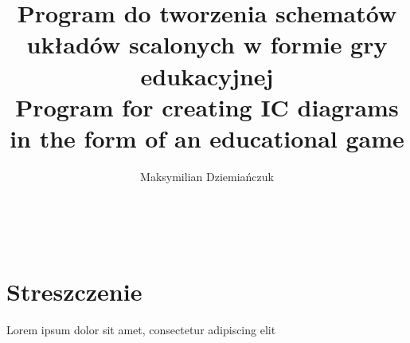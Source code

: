 \documentclass[12pt,a4paper,twoside]{report}
\title{\textbf{Program do tworzenia schematów układów scalonych w formie gry edukacyjnej}\\[2ex]
    \large Program for creating IC diagrams in the form of an educational game\\
}
\author{Maksymilian Dziemiańczuk}
\date{}
\begin{document}


\newpage \thispagestyle{empty} \ \newpage

\section*{Streszczenie}
\thispagestyle{plain}

Lorem ipsum dolor sit amet, consectetur adipiscing elit

\tableofcontents







\end{document}
